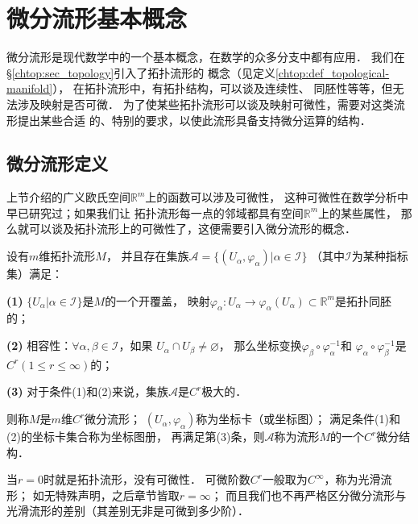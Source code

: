 \section{微分流形基本概念}\label{chdm:sec_differentiable-manifold}
微分流形是现代数学中的一个基本概念，在数学的众多分支中都有应用．
我们在\S \ref{chtop:sec_topology}引入了拓扑流形的
概念（见定义\ref{chtop:def_topological-manifold}），
在拓扑流形中，有拓扑结构，可以谈及连续性、
同胚性等等，但无法涉及映射是否可微．
为了使某些拓扑流形可以谈及映射可微性，需要对这类流形提出某些合适
的、特别的要求，以使此流形具备支持微分运算的结构．

\subsection{微分流形定义}\label{chdm:sec_dm}
上节介绍的广义欧氏空间$\mathbb{R}^m$上的函数可以涉及可微性，
这种可微性在数学分析中早已研究过；如果我们让
拓扑流形每一点的邻域都具有空间$\mathbb{R}^m$上的某些属性，
那么就可以谈及拓扑流形上的可微性了，这便需要引入微分流形的概念．


\begin{definition}\label{chdm:def_Dmanifold}
    设有$m$维拓扑流形$M$，
    并且存在集族$\mathscr{A}=\{(U_\alpha, \varphi_\alpha)|\alpha\in \mathscr{I}\}$
    （其中$\mathscr{I}$为某种指标集）满足：
    
    {\bfseries (1)} $\{U_\alpha|\alpha\in \mathscr{I}\}$是$M$的一个开覆盖，
    映射$\varphi_\alpha:U_\alpha \to \varphi_\alpha( U_\alpha) \subset \mathbb{R}^m$是拓扑同胚的；
    
    {\bfseries (2)} 相容性：$\forall \alpha,\beta \in \mathscr{I}$，如果
    $ U_\alpha \cap  U_\beta \neq \varnothing $，
    那么坐标变换$\varphi_\beta \circ \varphi_\alpha^{-1} $和
    $\varphi_\alpha \circ \varphi_\beta^{-1} $是$C^r (1\leqslant r \leqslant \infty)$的；
    
    {\bfseries (3)} 对于条件(1)和(2)来说，集族$\mathscr{A}$是$C^r$极大的．
    
    则称$M$是$m$维$C^r${\heiti 微分流形}；
    $(U_\alpha, \varphi_\alpha)$称为{\heiti 坐标卡}（或坐标图）；
    满足条件(1)和(2)的坐标卡集合称为{\heiti 坐标图册}，
    再满足第(3)条，则$\mathscr{A}$称为流形$M$的一个$C^r${\heiti 微分结构}．
\end{definition}
当$r=0$时就是拓扑流形，没有可微性．
可微阶数$C^r$一般取为$C^\infty$，称为{\heiti 光滑流形}；
如无特殊声明，之后章节皆取$r=\infty$；
而且我们也不再严格区分微分流形与光滑流形的差别（其差别无非是可微到多少阶）．


